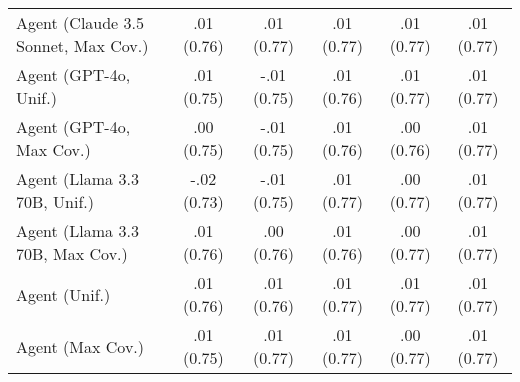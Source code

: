 \begin{table}[h!]
\begin{tabular}{lccccc}
    Agent (Claude 3.5 Sonnet, Max Cov.) & \cellcolor{gold!30}.01 {\small (0.76)} & \cellcolor{silver!30}.01 {\small (0.77)} & .01 {\small (0.77)} & .01 {\small (0.77)} & .01 {\small (0.77)} \\
    Agent (GPT-4o, Unif.) & .01 {\small (0.75)} & -.01 {\small (0.75)} & .01 {\small (0.76)} & .01 {\small (0.77)} & \cellcolor{bronze!30}.01 {\small (0.77)} \\
    Agent (GPT-4o, Max Cov.) & .00 {\small (0.75)} & -.01 {\small (0.75)} & .01 {\small (0.76)} & .00 {\small (0.76)} & .01 {\small (0.77)} \\
    Agent (Llama 3.3 70B, Unif.) & -.02 {\small (0.73)} & -.01 {\small (0.75)} & .01 {\small (0.77)} & .00 {\small (0.77)} & .01 {\small (0.77)} \\
    Agent (Llama 3.3 70B, Max Cov.) & \cellcolor{silver!30}.01 {\small (0.76)} & .00 {\small (0.76)} & .01 {\small (0.76)} & .00 {\small (0.77)} & .01 {\small (0.77)} \\
    Agent (Unif.) & .01 {\small (0.76)} & .01 {\small (0.76)} & \cellcolor{bronze!30}.01 {\small (0.77)} & \cellcolor{bronze!30}.01 {\small (0.77)} & .01 {\small (0.77)} \\
    Agent (Max Cov.) & .01 {\small (0.75)} & \cellcolor{bronze!30}.01 {\small (0.77)} & .01 {\small (0.77)} & .00 {\small (0.77)} & \cellcolor{bronze!30}.01 {\small (0.77)} \\
    \bottomrule
    \end{tabular}
\end{table}